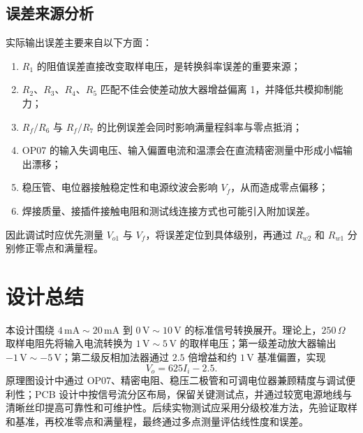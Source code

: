 \documentclass[UTF8,a4paper,zihao=-4]{ctexart}
\begin{document}
\subsection{误差来源分析}

实际输出误差主要来自以下方面：
\begin{enumerate}
  \item $R_1$ 的阻值误差直接改变取样电压，是转换斜率误差的重要来源；
  \item $R_2$、$R_3$、$R_4$、$R_5$ 匹配不佳会使差动放大器增益偏离 1，并降低共模抑制能力；
  \item $R_f/R_6$ 与 $R_f/R_7$ 的比例误差会同时影响满量程斜率与零点抵消；
  \item OP07 的输入失调电压、输入偏置电流和温漂会在直流精密测量中形成小幅输出漂移；
  \item 稳压管、电位器接触稳定性和电源纹波会影响 $V_f$，从而造成零点偏移；
  \item 焊接质量、接插件接触电阻和测试线连接方式也可能引入附加误差。
\end{enumerate}
因此调试时应优先测量 $V_{o1}$ 与 $V_f$，将误差定位到具体级别，再通过 $R_{w2}$ 和 $R_{w1}$ 分别修正零点和满量程。

\section{设计总结}

本设计围绕 $4\,\mathrm{mA}\sim20\,\mathrm{mA}$ 到 $0\,\mathrm{V}\sim10\,\mathrm{V}$ 的标准信号转换展开。理论上，$250\,\Omega$ 取样电阻先将输入电流转换为 $1\,\mathrm{V}\sim5\,\mathrm{V}$ 的取样电压；第一级差动放大器输出 $-1\,\mathrm{V}\sim-5\,\mathrm{V}$；第二级反相加法器通过 $2.5$ 倍增益和约 $1\,\mathrm{V}$ 基准偏置，实现
\[
  V_o = 625I_i - 2.5 .
\]
原理图设计中通过 OP07、精密电阻、稳压二极管和可调电位器兼顾精度与调试便利性；PCB 设计中按信号流分区布局，保留关键测试点，并通过较宽电源地线与清晰丝印提高可靠性和可维护性。后续实物测试应采用分级校准方法，先验证取样和基准，再校准零点和满量程，最终通过多点测量评估线性度和误差。
\end{document}
